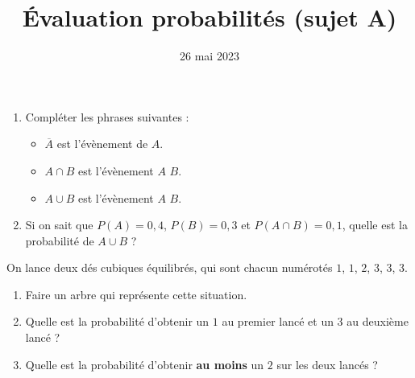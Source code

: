 \documentclass[
	classe=$2^{de}$
]{évaluation}
\date{26 mai 2023}
\begin{document}
\title{Évaluation probabilités (sujet A)}
\maketitle

\begin{exercice}[2,5]
	\begin{enumerate}
		\item Compléter les phrases suivantes :
		\begin{itemize}
			\item $\overline{A}$ est l'évènement  de $A$.
			\item $A ∩ B$ est l'évènement $A$  $B$.
			\item $A ∪ B$ est l'évènement $A$  $B$.
		\end{itemize}
		\item Si on sait que $P(A) = 0,4$, $P(B) = 0,3$ et $P(A ∩ B) = 0,1$, quelle est la probabilité de $A ∪ B$ ?
	\end{enumerate}
\end{exercice}

\begin{exercice}[3]
	On lance deux dés cubiques équilibrés, qui sont chacun numérotés $1$, $1$, $2$, $3$, $3$, $3$.
	\begin{enumerate}
		\item Faire un arbre qui représente cette situation.
		\item Quelle est la probabilité d'obtenir un $1$ au premier lancé et un $3$ au deuxième lancé ?
		\item Quelle est la probabilité d'obtenir \textbf{au moins} un $2$ sur les deux lancés ?
	\end{enumerate}
\end{exercice}
\end{document}
